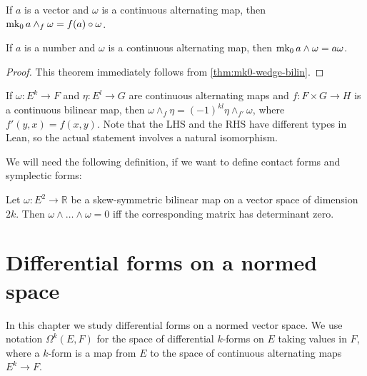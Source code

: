 \begin{theorem}%
  \label{thm:mk0-wedge-bilin}
  If \(a\) is a vector and \(\omega\) is a continuous alternating map,
  then \(\operatorname{mk_0} a \wedge_{f} \omega = f(a) \circ \omega\).
\end{theorem}

\begin{theorem}%
  \label{thm:mk0-wedge}
  If \(a\) is a number and \(\omega\) is a continuous alternating map,
  then \(\operatorname{mk_0} a \wedge \omega = a\omega\).
\end{theorem}
\begin{proof}
  This theorem immediately follows from \autoref{thm:mk0-wedge-bilin}.
\end{proof}

\begin{theorem}%
  \label{thm:wedge-comm}
  If \(\omega\colon E^{k}\to F\) and \(\eta\colon E^{l}\to G\) are continuous alternating maps
  and \(f \colon F \times G \to H\) is a continuous bilinear map,
  then \(\omega \wedge_{f} \eta = {(-1)}^{kl}\eta \wedge_{f'} \omega\),
  where \(f'(y, x) = f(x, y)\).
  Note that the LHS and the RHS have different types in Lean,
  so the actual statement involves a natural isomorphism.
\end{theorem}

We will need the following definition, if we want to define contact forms and symplectic forms:

\begin{theorem}%
  \label{thm:wedge-pow-zero-iff-det}
  Let \(\omega\colon E^{2}\to \mathbb R\) be a skew-symmetric bilinear map on a vector space of dimension \(2k\).
  Then \(\omega\wedge\dots\wedge\omega = 0\) iff the corresponding matrix has determinant zero.
\end{theorem}

\chapter{Differential forms on a normed space}%
\label{cha:differential-forms-normed-space}

In this chapter we study differential forms on a normed vector space.
We use notation \(\Omega^{k}(E, F)\) for the space of differential \(k\)-forms on \(E\) taking values in \(F\),
where a \(k\)-form is a map from \(E\) to the space of continuous alternating maps \(E^{k} \to F\).

